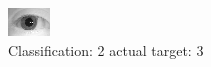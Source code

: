 \begin{figure}[h!]
\begin{center}
\includegraphics[width=0.60\columnwidth]{figures/ID1044_class_2_target_3.png}
\end{center}
\caption{ Classification: 2 actual target: 3}
\label{fig:ID1044_class_2_target_3}
\end{figure}
